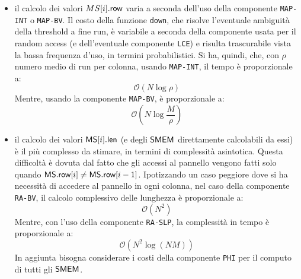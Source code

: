 \begin{itemize}
  \item il calcolo dei valori $MS[i].\mbox{\rm {\sf row}}$ varia a
  seconda dell'uso 
  della componente \texttt{MAP-INT} o \texttt{MAP-BV}. Il costo della funzione
  \texttt{down}, che risolve l'eventuale ambiguità della threshold a fine run,
  è variabile a seconda della componente usata per il random access (e 
  dell'eventuale componente \texttt{LCE}) e risulta trascurabile vista la bassa
  frequenza d'uso, in termini probabilistici. Si ha, quindi, che, con $\rho$
  numero medio di run per colonna, usando \texttt{MAP-INT}, il tempo è
  proporzionale a:
  \begin{equation}
    \label{eq:msthr1int}
    \mathcal{O}(N\log\rho)
  \end{equation}
  Mentre, usando la componente \texttt{MAP-BV}, è proporzionale a:
  \begin{equation}
    \label{eq:msthr1bv}
    \mathcal{O}\left(N\log\frac{M}{\rho}\right)
  \end{equation}
  \item il calcolo dei valori $\mbox{\rm {\sf MS}}[i].\mbox{\rm {\sf len}}$ (e degli $\mbox{\rm {\sf SMEM}}$ direttamente
  calcolabili da essi) è il
  più complesso da 
  stimare, in termini di complessità asintotica. Questa difficoltà è dovuta dal
  fatto che gli accessi al pannello vengono fatti solo quando $\mbox{\rm {\sf MS}}.\mbox{\rm {\sf row}}[i]\neq
  \mbox{\rm {\sf MS}}.\mbox{\rm {\sf row}}[i-1]$.
  Ipotizzando un caso peggiore dove si ha necessità di accedere al pannello in
  ogni 
  colonna, nel caso della componente \texttt{RA-BV}, il calcolo
  complessivo delle lunghezza è proporzionale a:
  \begin{equation}
    \label{eq:msthr2bv}
    \mathcal{O}(N^2)
  \end{equation}
  Mentre, con l'uso della componente \texttt{RA-SLP}, la complessità in tempo
  è proporzionale a: 
  \begin{equation}
    \label{eq:msthr2slp}
    \mathcal{O}\left(N^2\log (\mathit{NM})\right)
  \end{equation} 
  In aggiunta bisogna considerare i costi della componente \texttt{PHI} per il
  computo di tutti gli $\mbox{\rm {\sf SMEM}}$.
\end{itemize}
